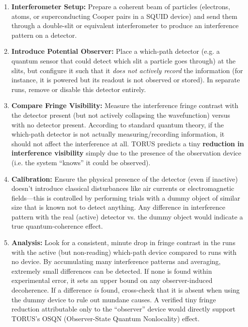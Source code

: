 \documentclass[]{article}
\begin{document}
{\begin{enumerate}
\def\labelenumi{\arabic{enumi}.}
\setcounter{enumi}{5}
\item
  \textbf{Interferometer Setup:} Prepare a coherent beam of particles
  (electrons, atoms, or superconducting Cooper pairs in a SQUID device)
  and send them through a double-slit or equivalent interferometer to
  produce an interference pattern on a detector.
\item
  \textbf{Introduce Potential Observer:} Place a which-path detector
  (e.g. a quantum sensor that could detect which slit a particle goes
  through) at the slits, but configure it such that it \emph{does not
  actively record} the information (for instance, it is powered but its
  readout is not observed or stored). In separate runs, remove or
  disable this detector entirely.
\item
  \textbf{Compare Fringe Visibility:} Measure the interference fringe
  contrast with the detector present (but not actively collapsing the
  wavefunction) versus with no detector present. According to standard
  quantum theory, if the which-path detector is not actually
  measuring/recording information, it should not affect the interference
  at all. TORUS predicts a tiny \textbf{reduction in interference
  visibility} simply due to the presence of the observation device (i.e.
  the system ``knows'' it could be observed)​.
\item
  \textbf{Calibration:} Ensure the physical presence of the detector
  (even if inactive) doesn't introduce classical disturbances like air
  currents or electromagnetic fields---this is controlled by performing
  trials with a dummy object of similar size that is known not to detect
  anything. Any difference in interference pattern with the real
  (active) detector vs. the dummy object would indicate a true
  quantum-coherence effect.
\item
  \textbf{Analysis:} Look for a consistent, minute drop in fringe
  contrast in the runs with the active (but non-reading) which-path
  device compared to runs with no device. By accumulating many
  interference patterns and averaging, extremely small differences can
  be detected. If none is found within experimental error, it sets an
  upper bound on any observer-induced decoherence. If a difference
  \emph{is} found, cross-check that it is absent when using the dummy
  device to rule out mundane causes. A verified tiny fringe reduction
  attributable only to the ``observer'' device would directly support
  TORUS's OSQN (Observer-State Quantum Nonlocality) effect.
\end{enumerate}

}
\end{document}
